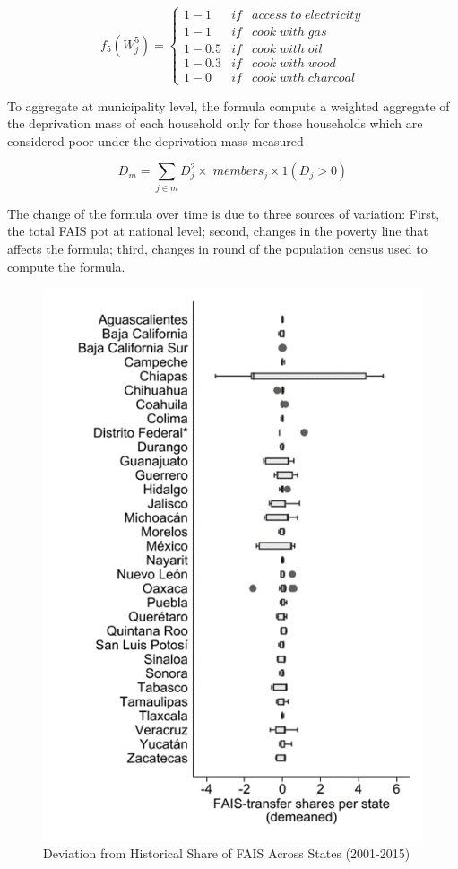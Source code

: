 \documentclass[dv_diss_main.tex]{subfiles}
\begin{document}
$$f_{5}(W_{j}^{5})= \left\{ 
\begin{array}{lcl}
    1-1      &   if  & access\; to\; electricity \\
    1-1      &   if  & cook\; with\; gas \\
    1-0.5    &   if  & cook\; with\; oil \\
    1-0.3    &   if  & cook\; with\; wood \\
    1-0      &   if  & cook\; with\; charcoal
\end{array}$$


To aggregate at municipality level, the formula compute a weighted aggregate of the deprivation mass of each household only for those households which are considered poor under the deprivation mass measured

$$D_{m} = \sum_{j\in m} D_j^2 \times \;members_{j} \times 1(D_j>0) $$

\label{ap:overtime}

The change of the formula over time is due to three sources of variation: First, the total FAIS pot at national level; second, changes in the poverty line that affects the formula; third, changes in round of the population census used to compute the formula. 

\begin{figure}[H] 
		\centering
		
		\includegraphics[width=0.67\linewidth]{figures/distribution_states.png}
		\caption{Deviation from Historical Share of FAIS Across States (2001-2015)}\label{fig:B1}
		
		\parbox{\textwidth}{\small 
		\vspace{2eX}
		\footnotesize	
		\faisvariation
		}
	
\end{figure}
\end{document}
